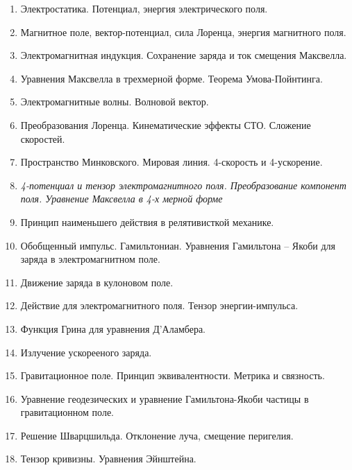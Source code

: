 \documentclass[unicode,10pt]{article}
\begin{document}
{\bfseries
{}

}

\begin{enumerate}
\item Электростатика. Потенциал, энергия электрического поля.
\item Магнитное поле, вектор-потенциал, сила Лоренца, энергия
  магнитного поля.
\item Электромагнитная индукция. Сохранение заряда и ток смещения
  Максвелла.
\item Уравнения Максвелла в трехмерной форме. Теорема Умова-Пойнтинга.
\item Электромагнитные волны. Волновой вектор.
\item Преобразования Лоренца. Кинематические эффекты СТО. Сложение
  скоростей.
\item Пространство Минковского. Мировая линия. 4-скорость и
  4-ускорение.
\item \textit{4-потенциал и тензор электромагнитного
  поля. Преобразование компонент поля. Уравнение Максвелла в 4-х
  мерной форме}
\item Принцип наименьшего действия в релятивисткой механике.
\item Обобщенный импульс. Гамильтониан. Уравнения Гамильтона -- Якоби
  для заряда в электромагнитном поле.
\item Движение заряда в кулоновом поле.
\item Действие для электромагнитного поля. Тензор энергии-импульса.
\item Функция Грина для уравнения Д'Аламбера.
\item Излучение ускорееного заряда.
\item Гравитационное поле. Принцип эквивалентности. Метрика и
  связность.
\item Уравнение геодезических и уравнение Гамильтона-Якоби частицы в
  гравитационном поле.
\item Решение Шварцшильда. Отклонение луча, смещение перигелия.
\item Тензор кривизны. Уравнения Эйнштейна.
\end{enumerate}
\end{document}
